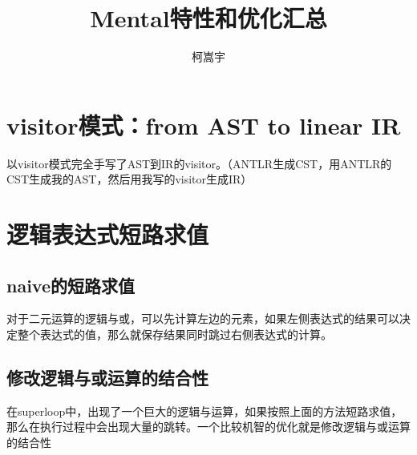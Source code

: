 \documentclass[11pt,a4paper]{article}
\title{Mental特性和优化汇总}
\author{柯嵩宇}
\begin{document}
\maketitle
\tableofcontents

\newpage
\section{visitor模式：from AST to linear IR}
	以visitor模式完全手写了AST到IR的visitor。（ANTLR生成CST，用ANTLR的CST生成我的AST，然后用我写的visitor生成IR）
\section{逻辑表达式短路求值}
\subsection{naive的短路求值}
	对于二元运算的逻辑与或，可以先计算左边的元素，如果左侧表达式的结果可以决定整个表达式的值，那么就保存结果同时跳过右侧表达式的计算。
\subsection{修改逻辑与或运算的结合性}
	在superloop中，出现了一个巨大的逻辑与运算，如果按照上面的方法短路求值，那么在执行过程中会出现大量的跳转。一个比较机智的优化就是修改逻辑与或运算的结合性
\end{document}
